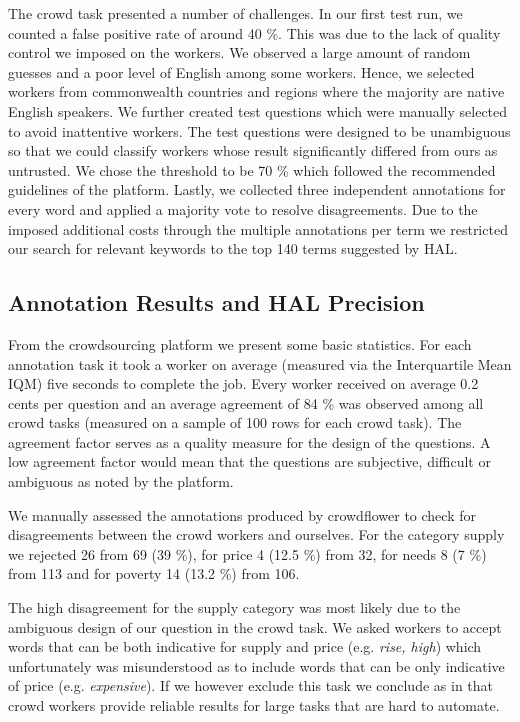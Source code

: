 The crowd task presented a number of challenges. In our first test run, we counted a false positive rate of around 40 \%. This was due to the lack of quality control we imposed on the workers. We observed a large amount of random guesses and a poor level of English among some workers. Hence, we selected workers from commonwealth countries and regions where the majority are native English speakers. We further created test questions which were manually selected to avoid inattentive workers. The test questions were designed to be unambiguous so that we could classify workers whose result significantly differed from ours as untrusted. We chose the threshold to be 70 \% which followed the recommended guidelines of the platform.   Lastly, we collected three independent annotations for every word and applied a majority vote to resolve disagreements. Due to the imposed additional costs through the multiple annotations per term we restricted our search for relevant keywords to the top 140 terms suggested by HAL.


\subsection{Annotation Results and HAL Precision}
\label{hal_result}

From the crowdsourcing platform we present some basic statistics. For each annotation task it took a worker on average (measured via the Interquartile Mean IQM) five seconds to complete the job. Every worker received on average 0.2 cents per question and an average agreement of 84 \% was observed among all crowd tasks (measured on a sample of 100 rows for each crowd task). The agreement factor serves as a quality measure for the design of the questions. A low agreement factor would mean that the questions are subjective, difficult or ambiguous as noted by the platform. 

We manually assessed the annotations produced by crowdflower to check for disagreements between the crowd workers and ourselves. For the category supply we rejected 26 from 69 (39 \%), for price 4 (12.5 \%) from 32, for needs 8 (7 \%) from 113 and for poverty 14 (13.2 \%) from 106. 

The high disagreement for the supply category was most likely due to the ambiguous design of our question in the crowd task. We asked workers to accept words that can be both indicative for supply and price (e.g. \emph{rise, high}) which unfortunately was misunderstood as to include words that can be only indicative of price (e.g. \emph{expensive}). If we however exclude this task we conclude as in \cite{alexandra15} that crowd workers provide reliable results for large tasks that are hard to automate. 

